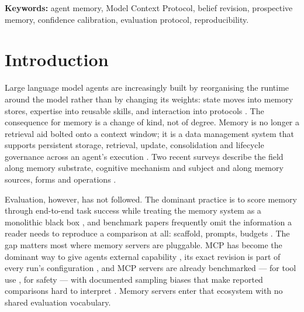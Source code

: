 \documentclass[11pt,a4paper]{article}
\begin{document}
\noindent\textbf{Keywords:} agent memory, Model Context Protocol, belief revision,
prospective memory, confidence calibration, evaluation protocol, reproducibility.

\section{Introduction}
\label{sec:intro}

Large language model agents are increasingly built by reorganising the runtime around the
model rather than by changing its weights: state moves into memory stores, expertise into
reusable skills, and interaction into protocols \cite{zhou2026externalization}. The consequence
for memory is a change of kind, not of degree. Memory is no longer a retrieval aid bolted onto
a context window; it is a data management system that supports persistent storage, retrieval,
update, consolidation and lifecycle governance across an agent's execution
\cite{zhou2026agentnative}. Two recent surveys describe the field along memory substrate,
cognitive mechanism and subject \cite{huan2026secondhalf} and along memory sources, forms and
operations \cite{zhang2024memorysurvey}.

Evaluation, however, has not followed. The dominant practice is to score memory through
end-to-end task success while treating the memory system as a monolithic black box
\cite{zhou2026agentnative}, and benchmark papers frequently omit the information a reader needs
to reproduce a comparison at all: scaffold, prompts, budgets \cite{moghadasi2026disclose}. The
gap matters most where memory servers are pluggable. MCP has become the dominant way to give
agents external capability \cite{anthropicmcp2024,mcpintro}, its exact revision is part of every
run's configuration \cite{mcpspec2025,mcpspec2025mar}, and MCP servers are already benchmarked
--- for tool use \cite{luo2025mcpbench,luo2025mcpuniverse,fan2025mcptoolbench}, for safety
\cite{zong2025mcpsafety} --- with documented sampling biases that make reported comparisons hard
to interpret \cite{afsar2026registry}. Memory servers enter that ecosystem with no shared
evaluation vocabulary.
\end{document}
